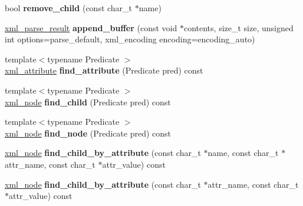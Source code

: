 \begin{DoxyCompactItemize}
\mbox{\label{classpugi_1_1xml__node_a1930157197e41cc15eea1fc00eecf1dd}} 
bool {\bfseries remove\+\_\+child} (const char\+\_\+t $\ast$name)
\item 
\mbox{\label{classpugi_1_1xml__node_a7e0126c503dcfba5111121ec4a94c11e}} 
\hyperlink{structpugi_1_1xml__parse__result}{xml\+\_\+parse\+\_\+result} {\bfseries append\+\_\+buffer} (const void $\ast$contents, size\+\_\+t size, unsigned int options=parse\+\_\+default, xml\+\_\+encoding encoding=encoding\+\_\+auto)
\item 
\mbox{\label{classpugi_1_1xml__node_a4494f8397e3bdf586b1dec6da19f5649}} 
{\footnotesize template$<$typename Predicate $>$ }\\\hyperlink{classpugi_1_1xml__attribute}{xml\+\_\+attribute} {\bfseries find\+\_\+attribute} (Predicate pred) const
\item 
\mbox{\label{classpugi_1_1xml__node_ad00b88f63f6015ee34d4e38dc8ed4e80}} 
{\footnotesize template$<$typename Predicate $>$ }\\\hyperlink{classpugi_1_1xml__node}{xml\+\_\+node} {\bfseries find\+\_\+child} (Predicate pred) const
\item 
\mbox{\label{classpugi_1_1xml__node_a8c360e4966b4015c50b927009c3d1ee3}} 
{\footnotesize template$<$typename Predicate $>$ }\\\hyperlink{classpugi_1_1xml__node}{xml\+\_\+node} {\bfseries find\+\_\+node} (Predicate pred) const
\item 
\mbox{\label{classpugi_1_1xml__node_a99f3257d66be8e738e1510626a1868e5}} 
\hyperlink{classpugi_1_1xml__node}{xml\+\_\+node} {\bfseries find\+\_\+child\+\_\+by\+\_\+attribute} (const char\+\_\+t $\ast$name, const char\+\_\+t $\ast$attr\+\_\+name, const char\+\_\+t $\ast$attr\+\_\+value) const
\item 
\mbox{\label{classpugi_1_1xml__node_ad25ae76828205df6bd4d306651b30bec}} 
\hyperlink{classpugi_1_1xml__node}{xml\+\_\+node} {\bfseries find\+\_\+child\+\_\+by\+\_\+attribute} (const char\+\_\+t $\ast$attr\+\_\+name, const char\+\_\+t $\ast$attr\+\_\+value) const
\item 

\end{DoxyCompactItemize}
